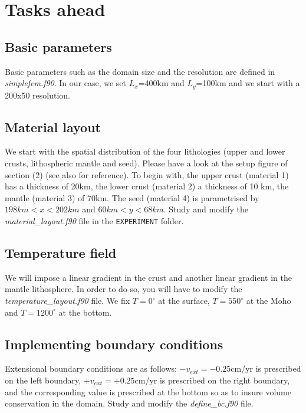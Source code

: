 \documentclass[a4paper]{article}
\begin{document}
\section{Tasks ahead}

\subsection{Basic parameters}

Basic parameters such as the domain size and the resolution are defined in {\sl simplefem.f90}.
In our case, we set $L_x$=400km and $L_y$=100km and we start with a 200x50 resolution. 


\subsection{Material layout}

We start with the spatial distribution of the four lithologies (upper and lower crusts, lithospheric mantle and seed). 
Please have a look at the setup figure of section (2) (see also \cite{nabu15} for reference). 
To begin with, the upper crust (material 1) has a thickness of 20km, the lower crust (material 2) a thickness of 10 km, 
the mantle (material 3) of 70km. The seed (material 4) is parametrised by $198km<x<202km$ and $60km<y<68km$.
Study and modify the {\sl material\_layout.f90} file in the {\tt EXPERIMENT} folder. 

\subsection{Temperature field}

We will impose a linear gradient in the crust and another linear gradient in the mantle lithosphere.
In order to do so, you will have to modify the {\sl temperature\_layout.f90} file. We fix $T=0^\circ$ at the 
surface, $T=550^\circ$ at the Moho and $T=1200^\circ$ at the bottom.


\subsection{Implementing boundary conditions}

Extensional boundary conditions are as follows: 
$-v_{ext}=-0.25$cm/yr is prescribed on the left boundary,
$+v_{ext}=+0.25$cm/yr is prescribed on the right boundary,
and the corresponding value is prescribed at the bottom so as to insure volume conservation in the domain.
Study and modify the {\sl define\_bc.f90} file.
\end{document}
